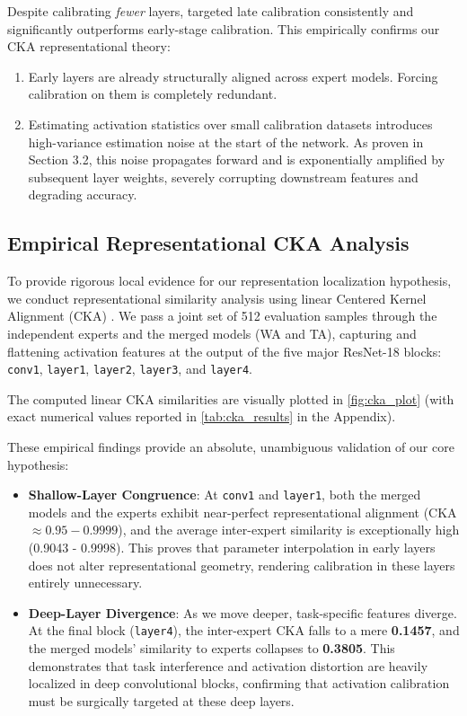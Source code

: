 \documentclass{article}
\theoremstyle{plain}
\theoremstyle{definition}
\begin{document}
Despite calibrating \textit{fewer} layers, targeted late calibration consistently and significantly outperforms early-stage calibration. This empirically confirms our CKA representational theory:
\begin{enumerate}\setlength{\itemsep}{0pt}\setlength{\parskip}{0pt}
    \item Early layers are already structurally aligned across expert models. Forcing calibration on them is completely redundant.
    \item Estimating activation statistics over small calibration datasets introduces high-variance estimation noise at the start of the network. As proven in Section 3.2, this noise propagates forward and is exponentially amplified by subsequent layer weights, severely corrupting downstream features and degrading accuracy.
\end{enumerate}

\subsection{Empirical Representational CKA Analysis}
To provide rigorous local evidence for our representation localization hypothesis, we conduct representational similarity analysis using linear Centered Kernel Alignment (CKA) \cite{kornblith2019similarity}. We pass a joint set of 512 evaluation samples through the independent experts and the merged models (WA and TA), capturing and flattening activation features at the output of the five major ResNet-18 blocks: \texttt{conv1}, \texttt{layer1}, \texttt{layer2}, \texttt{layer3}, and \texttt{layer4}.

The computed linear CKA similarities are visually plotted in \cref{fig:cka_plot} (with exact numerical values reported in \cref{tab:cka_results} in the Appendix).

These empirical findings provide an absolute, unambiguous validation of our core hypothesis:
\begin{itemize}\setlength{\itemsep}{0pt}\setlength{\parskip}{0pt}
    \item \textbf{Shallow-Layer Congruence}: At \texttt{conv1} and \texttt{layer1}, both the merged models and the experts exhibit near-perfect representational alignment (CKA $\approx 0.95 - 0.9999$), and the average inter-expert similarity is exceptionally high (0.9043 - 0.9998). This proves that parameter interpolation in early layers does not alter representational geometry, rendering calibration in these layers entirely unnecessary.
    \item \textbf{Deep-Layer Divergence}: As we move deeper, task-specific features diverge. At the final block (\texttt{layer4}), the inter-expert CKA falls to a mere \textbf{0.1457}, and the merged models' similarity to experts collapses to \textbf{0.3805}. This demonstrates that task interference and activation distortion are heavily localized in deep convolutional blocks, confirming that activation calibration must be surgically targeted at these deep layers.
\end{itemize}
\end{document}
